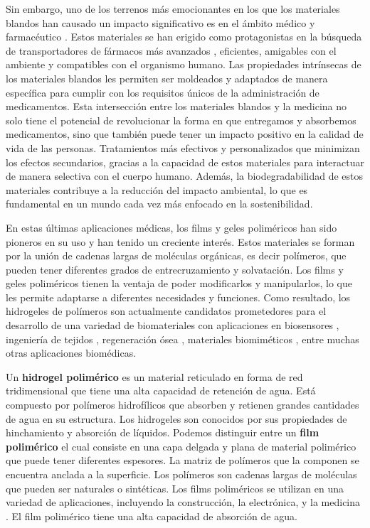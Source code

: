 Sin embargo, uno de los terrenos m\'as emocionantes en los que los materiales blandos han causado un impacto significativo es en el \'ambito m\'edico y farmac\'eutico \cite{rasool2019stimuli}. Estos materiales se han erigido como protagonistas en la b\'usqueda de transportadores de f\'armacos m\'as avanzados \cite{mcclements2017designing,annabi201425th}, eficientes, amigables con el ambiente y compatibles con el organismo humano. Las propiedades intr\'insecas de los materiales blandos les permiten ser moldeados y adaptados de manera espec\'ifica para cumplir con los requisitos \'unicos de la administraci\'on de medicamentos.
Esta intersecci\'on entre los materiales blandos y la medicina no solo tiene el potencial de revolucionar la forma en que entregamos y absorbemos medicamentos, sino que tambi\'en puede tener un impacto positivo en la calidad de vida de las personas. Tratamientos m\'as efectivos y personalizados que minimizan los efectos secundarios, gracias a la capacidad de estos materiales para interactuar de manera selectiva con el cuerpo humano. Adem\'as, la biodegradabilidad de estos materiales contribuye a la reducci\'on del impacto ambiental, lo que es fundamental en un mundo cada vez m\'as enfocado en la sostenibilidad.

En estas \'ultimas aplicaciones m\'edicas, los films y geles polim\'ericos han sido pioneros en su uso y han tenido un creciente inter\'es. Estos materiales se forman por la uni\'on de cadenas largas de mol\'eculas org\'anicas, es decir pol\'imeros, que pueden tener diferentes grados de entrecruzamiento y solvataci\'on. Los films y geles polim\'ericos tienen la ventaja de poder modificarlos y manipularlos, lo que les permite adaptarse a diferentes necesidades y funciones.
Como resultado, los hidrogeles de pol\'imeros son actualmente candidatos prometedores para el desarrollo de una variedad de biomateriales con aplicaciones en biosensores \cite{zhang2012ultrathin,islam2014responsive}, ingenier\'ia de tejidos \cite{matricardi2013interpenetrating,van2011biopolymer}, regeneraci\'on \'osea \cite{bai2018bioactive}, materiales biomim\'eticos \cite{green2016mimicking,wu2010multifunctional}, entre muchas otras aplicaciones biom\'edicas.\cite{Daly2020}

Un \textbf{hidrogel polim\'erico} es un material reticulado en forma de red tridimensional que tiene una alta capacidad de retenci\'on de agua. Est\'a compuesto por pol\'imeros hidrof\'ilicos que absorben y retienen grandes cantidades de agua en su estructura. Los hidrogeles son conocidos por sus propiedades de hinchamiento y absorci\'on de l\'iquidos.
Podemos distinguir entre un  \textbf{film polim\'erico} el cual consiste en una capa delgada y plana de material polim\'erico que puede tener diferentes espesores. La  matriz de pol\'imeros que la componen se encuentra anclada a la superficie. Los pol\'imeros son cadenas largas de mol\'eculas que pueden ser naturales o sint\'eticas. Los films polim\'ericos se utilizan en una variedad de aplicaciones, incluyendo la construcci\'on, la electr\'onica, y la medicina \addcite.
El film polim\'erico  tiene una alta capacidad de absorci\'on de agua. 

